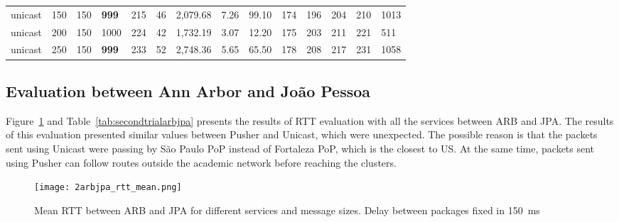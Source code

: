 \begin{table}[!htb]
\begin{tabular}{llllllllllllll}
		unicast & 150          & 150   & \textbf{999}  & 215   & 46   & 2,079.68      & 7.26     & 99.10    & 174  & 196  & 204   & 210   & 1013  \\
		unicast & 200          & 150   & 1000 & 224   & 42   & 1,732.19      & 3.07     & 12.20    & 175  & 203  & 211   & 221   & 511   \\
		unicast & 250          & 150   & \textbf{999}  & 233   & 52   & 2,748.36      & 5.65     & 65.50    & 178  & 208  & 217   & 231   & 1058 \\ \bottomrule
	\end{tabular}
\end{table} 

\vfill
\pagebreak

\subsection*{Evaluation between Ann Arbor and João Pessoa} 

Figure~\ref{fig:second-arb-jpa-rtt} and Table~\ref{tab:secondtrialarbjpa} presents the results of RTT evaluation with all the services between ARB and JPA.
The results of this evaluation presented similar values between Pusher and Unicast, which were unexpected.
The possible reason is that the packets sent using Unicast were passing by São Paulo PoP instead of Fortaleza PoP, which is the closest to US.
At the same time, packets sent using Pusher can follow routes outside the academic network before reaching the clusters.

\begin{figure}[!ht]
	\centering
	\texttt{[image: 2arbjpa\_rtt\_mean.png]}
	\caption{Mean RTT between ARB and JPA for different services and message sizes. Delay between packages fixed in 150~ms}
	\label{fig:second-arb-jpa-rtt}
\end{figure}

